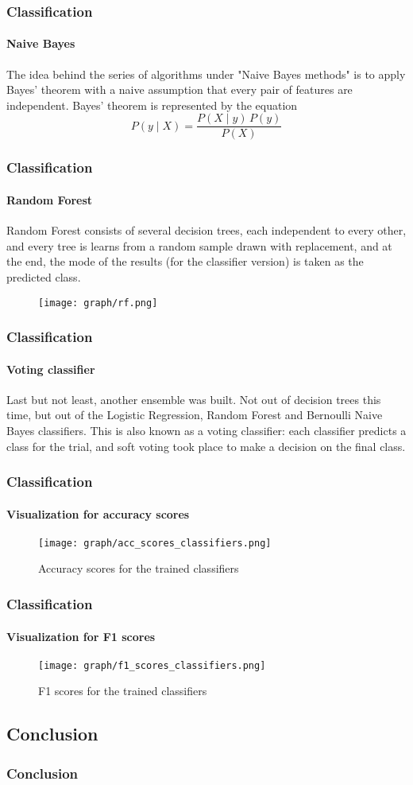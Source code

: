 \documentclass{beamer}
\begin{document}
	\begin{frame}
		\frametitle{Classification}
		\framesubtitle{Naive Bayes}
		The idea behind the series of algorithms under "Naive Bayes methods" is to apply Bayes' theorem with a naive assumption that every pair of features are independent. Bayes' theorem is represented by the equation $$ P(y \mid X) = \frac{P(X \mid y) \, P(y)}{P(X)} $$
	\end{frame}
	\begin{frame}
		\frametitle{Classification}
		\framesubtitle{Random Forest}
		Random Forest consists of several decision trees, each independent to every other, and every tree is learns from a random sample drawn with replacement, and at the end, the mode of the results (for the classifier version) is taken as the predicted class.
		\begin{figure}
			\centering
			\texttt{[image: graph/rf.png]}
		\end{figure}
	\end{frame}
	\begin{frame}
		\frametitle{Classification}
		\framesubtitle{Voting classifier}
		Last but not least, another ensemble was built. Not out of decision trees this time, but out of the Logistic Regression, Random Forest and Bernoulli Naive Bayes classifiers. This is also known as a voting classifier: each classifier predicts a class for the trial, and soft voting took place to make a decision on the final class.
	\end{frame}
	\begin{frame}
		\frametitle{Classification}
		\framesubtitle{Visualization for accuracy scores}
		\begin{figure}
		  \texttt{[image: graph/acc\_scores\_classifiers.png]}
		  \caption{Accuracy scores for the trained classifiers}
		  \label{fig:graph10}
		\end{figure}
	\end{frame}
	\begin{frame}
		\frametitle{Classification}
		\framesubtitle{Visualization for F1 scores}
		\begin{figure}
		  \texttt{[image: graph/f1\_scores\_classifiers.png]}
		  \caption{F1 scores for the trained classifiers}
		  \label{fig:graph11}
		\end{figure}\newline
	\end{frame}
	\begin{frame}
		\section[Section]{Conclusion}
		\frametitle{Conclusion}
	\end{frame}
\end{document}
